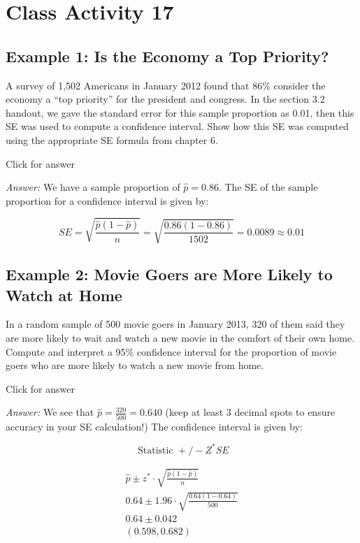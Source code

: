 \documentclass[
]{book}
\begin{document}
\hypertarget{class-activity-17}{%
\chapter{Class Activity 17}\label{class-activity-17}}

\hypertarget{example-1-is-the-economy-a-top-priority}{%
\section{Example 1: Is the Economy a Top Priority?}\label{example-1-is-the-economy-a-top-priority}}

A survey of 1,502 Americans in January 2012 found that 86\% consider the economy a ``top priority'' for the president and congress. In the section 3.2 handout, we gave the standard error for this sample proportion as 0.01, then this SE was used to compute a confidence interval. Show how this SE was computed using the appropriate SE formula from chapter 6.

Click for answer

\emph{Answer:} We have a sample proportion of \(\hat{p}= 0.86\). The SE of the sample proportion for a confidence interval is given by:

\[S E=\sqrt{\frac{\hat{p}(1-\hat{p})}{n}}=\sqrt{\frac{0.86(1-0.86)}{1502}}=0.0089 \approx 0.01\]

\hypertarget{example-2-movie-goers-are-more-likely-to-watch-at-home}{%
\section{Example 2: Movie Goers are More Likely to Watch at Home}\label{example-2-movie-goers-are-more-likely-to-watch-at-home}}

In a random sample of 500 movie goers in January 2013, 320 of them said they are more likely to wait and watch a new movie in the comfort of their own home. Compute and interpret a 95\% confidence interval for the proportion of movie goers who are more likely to watch a new movie from home.

Click for answer

\emph{Answer:} We see that \(\hat{p}=\frac{320}{500}=0.640\) (keep at least 3 decimal spots to ensure accuracy in your SE calculation!) The confidence interval is given by:

\[\text { Statistic }+/-Z^{*} S E\]

\[\begin{array}{l}
\hat{p} \pm z^{*} \cdot \sqrt{\frac{\hat{p}(1-\hat{p})}{n}} \\
0.64 \pm 1.96 \cdot \sqrt{\frac{0.64(1-0.64)}{500}} \\
0.64 \pm 0.042\\
(0.598, 0.682)
\end{array}\]
\end{document}

